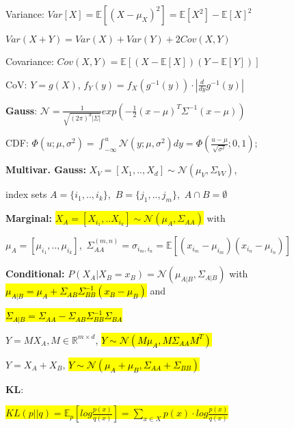 \documentclass[11pt,landscape,a4paper,fleqn]{article}
\newcommand{\mhl}[1]{\setlength{\fboxsep}{0pt}\colorbox{yellow}{#1}}
\begin{document}
\begin{multicols*}{4}
Variance: $Var[X] = \mathbb{E}[(X-\mu_X)^2] = \mathbb{E}[X^2] - \mathbb{E}[X]^2$

$Var(X + Y) = Var(X) + Var(Y) + 2Cov(X,Y)$

Covariance: $Cov(X, Y) = \mathbb{E}[(X - \mathbb{E}[X])(Y - \mathbb{E}[Y])]$

CoV: $Y = g(X)$, $f_Y(y) = f_X(g^{-1}(y)) \cdot |\frac{d}{dy} g^{-1}(y)|$

\textbf{Gauss}: \mbox{\fontsize{10}{6}\selectfont $\mathcal{N} = \frac{1}{\sqrt{(2\pi)^d |\Sigma|}}exp(-\frac{1}{2}(x-\mu)^T\Sigma^{-1} (x-\mu))$}

CDF: \mbox{\fontsize{9}{6}\selectfont $\Phi(u;\mu,\sigma^2) = \int_{-\infty}^{u}\mathcal{N}(y;\mu,\sigma^2)dy=\Phi(\frac{u-\mu}{\sqrt{\sigma^2}};0,1)$;}

\textbf{Multivar. Gauss:}
\mbox{\fontsize{10}{6}\selectfont $X_V = [X_1, .., X_d] \sim \mathcal{N}(\mu_V, \Sigma_{VV})$},

index sets \mbox{\fontsize{9}{6}\selectfont $A = \{i_1,..,i_k\}$, $B = \{j_1,..,j_m\}$, $A \cap B = \emptyset$}

\textbf{Marginal:} \mhl{$X_A = [X_{i_1},..X_{i_k}] \sim \mathcal{N}(\mu_A, \Sigma_{AA})$} with

\mbox{\fontsize{8.8}{6}\selectfont $\mu_A = [\mu_{i_1},..,\mu_{i_k}]$, $\Sigma_{AA}^{(m,n)} = \sigma_{i_m,i_n} = \mathbb{E}[(x_{i_m} - \mu_{i_m}) (x_{i_n} - \mu_{i_n})]$}

\textbf{Conditional:} $P(X_A | X_B = x_B) = \mathcal{N}(\mu_{A|B}, \Sigma_{A|B})$ with \hl{$\mu_{A|B} = \mu_A + \Sigma_{AB} \Sigma_{BB}^{-1} (x_B - \mu_B)$} and 

\hl{$\Sigma_{A|B} = \Sigma_{AA} - \Sigma_{AB} \Sigma_{BB}^{-1} \Sigma_{BA}$}

$Y = M X_A, M \in \mathbb{R}^{m \times d}$, \hl{$Y \sim \mathcal{N}(M\mu_A, M\Sigma_{AA}M^T)$}

$Y = X_A + X_B$, \hl{$Y \sim \mathcal{N}(\mu_A + \mu_B, \Sigma_{AA} + \Sigma_{BB})$}



\textbf{KL}: {\fontsize{10.5}{6}\selectfont \mhl{$KL(p||q) = \mathbb{E}_p[log\frac{p(x)}{q(x)}] = \sum_{x \in X} p(x) \cdot log \frac{p(x)}{q(x)}$}
	
}
\end{multicols*}
\end{document}
